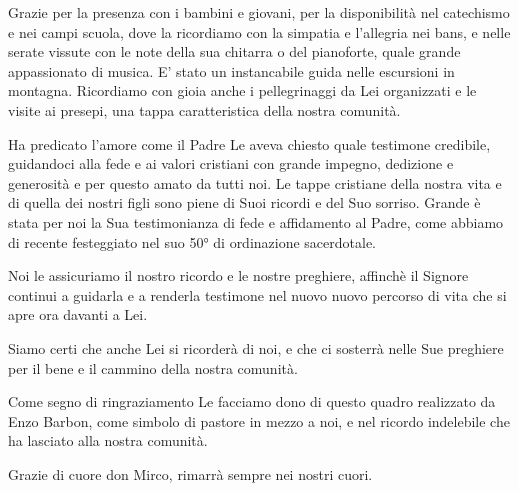 Grazie per la presenza con i bambini e giovani, per la disponibilità nel catechismo e nei campi scuola, dove la ricordiamo con la simpatia e l’allegria nei bans, e nelle serate vissute con le note della sua chitarra o del pianoforte, quale grande appassionato di musica. E’ stato un instancabile guida nelle escursioni in montagna. Ricordiamo con gioia anche i pellegrinaggi da Lei organizzati e le visite ai presepi, una tappa caratteristica della nostra comunità.

Ha predicato l’amore come il Padre Le aveva chiesto quale testimone credibile, guidandoci alla fede e ai valori cristiani con grande impegno, dedizione e generosità e per questo amato da tutti noi. Le tappe cristiane della nostra vita e di quella dei nostri figli sono piene di Suoi ricordi e del Suo sorriso. Grande è stata per noi la Sua testimonianza di fede e affidamento al Padre, come abbiamo di recente festeggiato nel suo 50° di ordinazione sacerdotale.

Noi le assicuriamo il nostro ricordo e le nostre preghiere, affinchè il Signore continui a guidarla e a renderla testimone nel nuovo nuovo percorso di vita che si apre ora davanti a Lei.

Siamo certi che anche Lei si ricorderà di noi, e che ci sosterrà nelle Sue preghiere per il bene e il cammino della nostra comunità.

Come segno di ringraziamento Le facciamo dono di questo quadro realizzato da Enzo Barbon, come simbolo di pastore in mezzo a noi, e nel ricordo indelebile che ha lasciato alla nostra comunità. 


Grazie di cuore don Mirco, rimarrà sempre nei nostri cuori.


